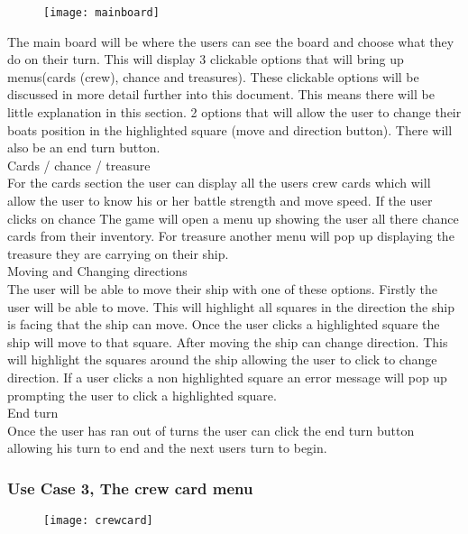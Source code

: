 \documentclass{article}
\begin{document}
		\begin{figure}[H]
		\centering
		\texttt{[image: mainboard]}
		\label{fig:mainboard}
		\end{figure}	
	The main board will be where the users can see the board and choose what they do on their turn. This will display 3 clickable options that will bring up menus(cards (crew), chance and treasures). These clickable options will be discussed in more detail further into this document. This means there will be little explanation in this section. 2 options that will allow the user to change their boats position in the highlighted square (move and direction button). There will also be an end turn button.\\
	
	Cards / chance / treasure\\
For the cards section the user can display all the users crew cards which will allow the user to know his or her battle strength and move speed. If the user clicks on chance The game will open a menu up showing the user all there chance cards from their inventory. For treasure another menu will pop up displaying the treasure they are carrying on their ship. \\

Moving and Changing directions\\
The user will be able to move their ship with one of these options. Firstly the user will be able to move. This will highlight all squares in the direction the ship is facing that the ship can move. Once the user clicks a highlighted square the ship will move to that square. After moving the ship can change direction. This will highlight the squares around the ship allowing the user to click to change direction. If a user clicks a non highlighted square an error message will pop up prompting the user to click a highlighted square. \\

End turn\\
Once the user has ran out of turns the user can click the end turn button allowing his turn to end and the next users turn to begin.\\

	\subsubsection{Use Case 3, The crew card menu}
	
		\begin{figure}[H]
		\centering
		\texttt{[image: crewcard]}
		\label{fig:crewcard}
		\end{figure}
		
\end{document}
